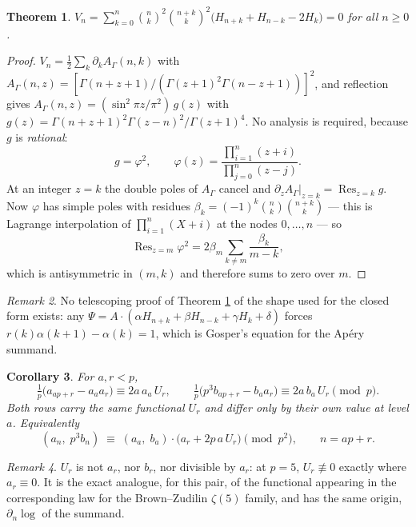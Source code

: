 \documentclass[11pt,a4paper]{amsart}
\theoremstyle{plain}
\newtheorem{theorem}{Theorem}[section]
\newtheorem{corollary}[theorem]{Corollary}
\theoremstyle{definition}
\theoremstyle{remark}
\newtheorem{remark}[theorem]{Remark}
\newcommand{\A}{A}
\DeclareMathOperator{\Res}{Res}
\begin{document}
\begin{theorem}\label{thm:V}
$V_n=\displaystyle\sum_{k=0}^{n}\binom nk^2\binom{n+k}k^2\bigl(H_{n+k}+H_{n-k}-2H_k\bigr)=0$
for all $n\ge0$.
\end{theorem}

\begin{proof}
$V_n=\tfrac12\sum_k\partial_k \A_\Gamma(n,k)$ with
$\A_\Gamma(n,z)=[\Gamma(n+z+1)/(\Gamma(z+1)^2\Gamma(n-z+1))]^2$, and reflection gives
$\A_\Gamma(n,z)=(\sin^2\pi z/\pi^2)\,g(z)$ with
$g(z)=\Gamma(n+z+1)^2\Gamma(z-n)^2/\Gamma(z+1)^4$. No analysis is required, because $g$ is
\emph{rational}:
\[
  g=\varphi^2,\qquad
  \varphi(z)=\frac{\prod_{i=1}^{n}(z+i)}{\prod_{j=0}^{n}(z-j)} .
\]
At an integer $z=k$ the double poles of $\A_\Gamma$ cancel and
$\partial_z \A_\Gamma|_{z=k}=\Res_{z=k}g$. Now $\varphi$ has simple poles with residues
$\beta_k=(-1)^k\binom nk\binom{n+k}k$ — this is Lagrange interpolation of
$\prod_{i=1}^n(X+i)$ at the nodes $0,\dots,n$ — so
\[
  \Res_{z=m}\varphi^2=2\beta_m\sum_{k\neq m}\frac{\beta_k}{m-k},
\]
which is antisymmetric in $(m,k)$ and therefore sums to zero over $m$.
\end{proof}

\begin{remark}
No telescoping proof of Theorem \ref{thm:V} of the shape used for the closed form exists:
any $\Psi=\A\cdot(\alpha H_{n+k}+\beta H_{n-k}+\gamma H_k+\delta)$ forces
$r(k)\alpha(k+1)-\alpha(k)=1$, which is Gosper's equation for the Ap\'ery summand.
\end{remark}

\begin{corollary}\label{cor:first}
For $a,r<p$,
\[
  \tfrac1p\bigl(a_{ap+r}-a_aa_r\bigr)\equiv 2a\,a_a\,U_r,
  \qquad
  \tfrac1p\bigl(p^3b_{ap+r}-b_aa_r\bigr)\equiv 2a\,b_a\,U_r \pmod p .
\]
Both rows carry the same functional $U_r$ and differ only by their own value at level $a$.
Equivalently
\[
  (a_n,\;p^3b_n)\;\equiv\;(a_a,\;b_a)\cdot\bigl(a_r+2p\,a\,U_r\bigr)\pmod{p^2},
  \qquad n=ap+r .
\]
\end{corollary}

\begin{remark}
$U_r$ is not $a_r$, nor $b_r$, nor divisible by $a_r$: at $p=5$, $U_r\not\equiv0$ exactly
where $a_r\equiv0$. It is the exact analogue, for this pair, of the functional appearing
in the corresponding law for the Brown--Zudilin $\zeta(5)$ family, and has the same
origin, $\partial_n\log$ of the summand.
\end{remark}
\end{document}
